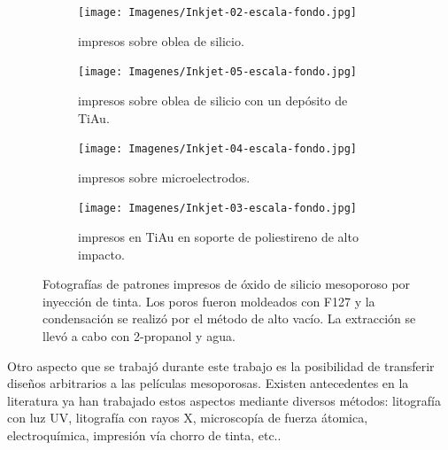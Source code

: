   			\begin{figure}[b!]
			 	   	    \centering
			 	   	    \begin{subfigure}[t]{0.495\textwidth}
			        	\texttt{[image: Imagenes/Inkjet-02-escala-fondo.jpg]}
			        	\caption{\pdmF\space impresos sobre oblea de silicio.}
			       		\end{subfigure}
			     		\centering
			     		\begin{subfigure}[t]{0.495\textwidth}
			     		\texttt{[image: Imagenes/Inkjet-05-escala-fondo.jpg]}
			    		\caption{\pdmF\space impresos sobre oblea de silicio con un depósito de Ti\textbar Au.}
			    		\end{subfigure}
			    		\centering
			    		\begin{subfigure}[t]{0.495\textwidth}
			         	\texttt{[image: Imagenes/Inkjet-04-escala-fondo.jpg]}
			        	\caption{\pdmF\space impresos sobre microelectrodos.}
			        	\end{subfigure}
			        	\centering
			        	\begin{subfigure}[t]{0.495\textwidth}
			     		\texttt{[image: Imagenes/Inkjet-03-escala-fondo.jpg]}
 			        	\caption{\pdmF\space impresos en Ti\textbar	Au en soporte de poliestireno de alto impacto.}
			        	\end{subfigure}
			     		\caption[Electrodos impresos]{Fotografías de patrones impresos de óxido de silicio mesoporoso por inyección de tinta. Los poros fueron moldeados con F127 y la condensación se realizó por el método de alto vacío. La extracción se llevó a cabo con 2-propanol y agua.}
			     		\label{fig:flexibles}
			     	   	\end{figure}

 	  Otro aspecto que se trabajó durante este trabajo es la posibilidad de transferir diseños arbitrarios a las películas mesoporosas. Existen antecedentes en la literatura ya han trabajado estos aspectos mediante diversos métodos: litografía con luz UV, litografía con rayos X, microscopía de fuerza átomica, electroquímica, impresión vía chorro de tinta, etc.\cite{Innocenzi2008}. 

